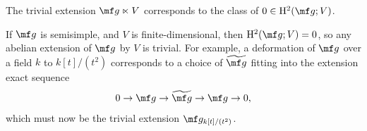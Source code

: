 \documentclass[../notes.tex]{subfiles}
\begin{document}
\begin{remark}
	The trivial extension $\mf g\ltimes V$ corresponds to the class of $0\in\mathrm H^2(\mf g;V)$.
\end{remark}
\begin{example}
	If $\mf g$ is semisimple, and $V$ is finite-dimensional, then $\mathrm H^2(\mf g;V)=0$, so any abelian extension of $\mf g$ by $V$ is trivial. For example, a deformation of $\mf g$ over a field $k$ to $k[t]/\left(t^2\right)$ corresponds to a choice of $\widetilde{\mf g}$ fitting into the extension exact sequence
	\[0\to\mf g\to\widetilde{\mf g}\to\mf g\to0,\]
	which must now be the trivial extension $\mf g_{k[t]/\left(t^2\right)}$.
\end{example}
\end{document}
